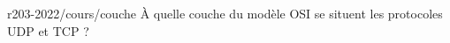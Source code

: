 \begin{question}{r203-2022/cours/couche}
  À quelle couche du modèle OSI se situent les protocoles UDP et TCP ?
  \begin{choices}
  \end{choices}
\end{question}

